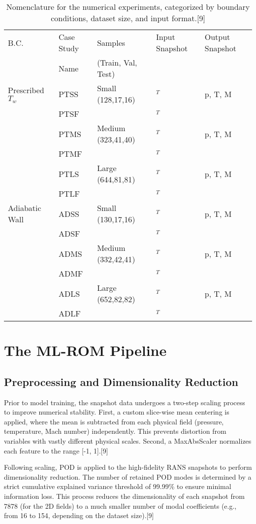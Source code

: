 \documentclass[12pt, a4paper]{report}
\begin{document}
\begin{table}[htbp]
\centering
\caption{Nomenclature for the numerical experiments, categorized by boundary conditions, dataset size, and input format.[9]}
\label{tab:nozzle_cases}
\begin{tabular}{@{}lllll@{}}
\toprule
B.C. & Case Study & Samples & Input Snapshot & Output Snapshot \\
 & Name & (Train, Val, Test) & & \\
\midrule
Prescribed $T_w$ & PTSS & Small (128,17,16) & $^T$ & p, T, M \\
& PTSF & & $^T$ & \\
\cmidrule(l){2-5}
& PTMS & Medium (323,41,40) & $^T$ & p, T, M \\
& PTMF & & $^T$ & \\
\cmidrule(l){2-5}
& PTLS & Large (644,81,81) & $^T$ & p, T, M \\
& PTLF & & $^T$ & \\
\midrule
Adiabatic Wall & ADSS & Small (130,17,16) & $^T$ & p, T, M \\
& ADSF & & $^T$ & \\
\cmidrule(l){2-5}
& ADMS & Medium (332,42,41) & $^T$ & p, T, M \\
& ADMF & & $^T$ & \\
\cmidrule(l){2-5}
& ADLS & Large (652,82,82) & $^T$ & p, T, M \\
& ADLF & & $^T$ & \\
\bottomrule
\end{tabular}
\end{table}

\section{The ML-ROM Pipeline}

\subsection{Preprocessing and Dimensionality Reduction}
Prior to model training, the snapshot data undergoes a two-step scaling process to improve numerical stability. First, a custom slice-wise mean centering is applied, where the mean is subtracted from each physical field (pressure, temperature, Mach number) independently. This prevents distortion from variables with vastly different physical scales. Second, a MaxAbsScaler normalizes each feature to the range [-1, 1].[9]

Following scaling, POD is applied to the high-fidelity RANS snapshots to perform dimensionality reduction. The number of retained POD modes is determined by a strict cumulative explained variance threshold of 99.99\% to ensure minimal information loss. This process reduces the dimensionality of each snapshot from 7878 (for the 2D fields) to a much smaller number of modal coefficients (e.g., from 16 to 154, depending on the dataset size).[9]
\end{document}
